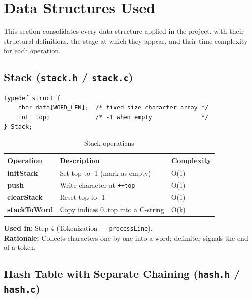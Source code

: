 \documentclass[12pt,a4paper]{article}
\begin{document}
\newpage


\section{Data Structures Used}

This section consolidates every data structure applied in the project, with their structural definitions, the stage at which they appear, and their time complexity for each operation.

\subsection{Stack (\texttt{stack.h} / \texttt{stack.c})}

\begin{lstlisting}[caption={Stack type definition -- \texttt{stack.h}}]
typedef struct {
    char data[WORD_LEN];  /* fixed-size character array */
    int  top;             /* -1 when empty              */
} Stack;
\end{lstlisting}

\begin{table}[H]
\centering\renewcommand{\arraystretch}{1.3}
\begin{tabularx}{0.92\textwidth}{>{\bfseries\ttfamily}l X l}
\toprule
Operation & Description & Complexity \\\midrule
initStack    & Set top to -1 (mark as empty)              & O(1) \\
push         & Write character at \texttt{++top}          & O(1) \\
clearStack   & Reset top to -1                            & O(1) \\
stackToWord  & Copy indices 0..top into a C-string        & O(k) \\
\bottomrule
\end{tabularx}
\caption{Stack operations}
\end{table}

\textbf{Used in:} Step 4 (Tokenization — \texttt{processLine}).\\
\textbf{Rationale:} Collects characters one by one into a word; delimiter signals the end of a token.

\subsection{Hash Table with Separate Chaining (\texttt{hash.h} / \texttt{hash.c})}
\end{document}
